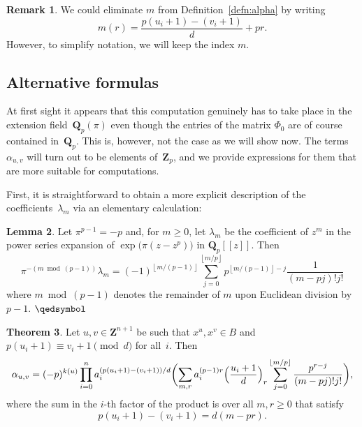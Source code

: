 \documentclass[a4paper,11pt]{article}
\numberwithin{equation}{section}
\providecommand{\floor}[1]{\left\lfloor#1\right\rfloor}   %
\newcommand{\ZZ}{\mathbf{Z}} %
\newcommand{\QQ}{\mathbf{Q}} %
\theoremstyle{definition}
\newtheorem{thm}{Theorem}[section]
\newtheorem{lem}[thm]{Lemma}
\newtheorem{rem}[thm]{Remark}
\begin{document}
\begin{rem}
We could eliminate $m$ from Definition~\ref{defn:alpha} by writing 
\[
m(r)=\frac{p(u_i+1) - (v_i+1)}{d}+pr.
\]
However, to simplify notation, we will keep the index $m$.
\end{rem}

\subsection{Alternative formulas}

At first sight it appears that this computation genuinely has to 
take place in the extension field~$\QQ_p(\pi)$ even though the entries
of the matrix $\Phi_0$ are of course contained in~$\QQ_p$.  This is, however, 
not the case as we will show now.  The terms $\alpha_{u,v}$ 
will turn out to be elements of~$\ZZ_p$, and we provide expressions 
for them that are more suitable for computations.

First, it is straightforward to obtain a more explicit description 
of the coefficients~$\lambda_m$ via an elementary calculation:

\begin{lem} \label{lem:lambdam}
Let $\pi^{p-1} = -p$ and, for $m \geq 0$, let $\lambda_m$ 
be the coefficient of $z^m$ in the power series expansion 
of $\exp \bigl( \pi (z - z^p) \bigr)$ in $\QQ_p[[z]]$.  Then 
\begin{equation*}
\pi^{- (m \bmod{(p-1)})} \lambda_m = (-1)^{\floor{m/(p-1)}} \sum_{j=0}^{\floor{m/p}} p^{\floor{m/(p-1)} - j} \frac{1}{(m-pj)! j!}
\end{equation*}
where $m \bmod{(p-1)}$ denotes the remainder of $m$ upon Euclidean 
division by $p-1$. \hfill $\qedsymbol$
\end{lem}

\begin{thm} \label{thm:alpha}
Let $u, v \in \ZZ^{n+1}$ be such that 
$x^u, x^v \in B$ and 
$p (u_i + 1) \equiv v_i + 1 \pmod{d}$ for all~$i$. 
Then 
\begin{equation*}
\alpha_{u,v} = (-p)^{k(u)} \prod_{i=0}^n a_i^{(p (u_i + 1) - (v_i + 1))/d} 
    \biggl( \sum_{m,r} a_i^{(p-1)r} \Bigl( \frac{u_i+1}{d} \Bigr)_r 
        \sum_{j=0}^{\floor{m/p}} \frac{p^{r-j}}{(m-pj)!j!} \biggr),
\end{equation*}
where the sum in the $i$-th factor of the product is over all $m, r \geq 0$  
that satisfy
\[
p(u_i+1)-(v_i+1)=d(m-pr).
\]
\end{thm}
\end{document}
